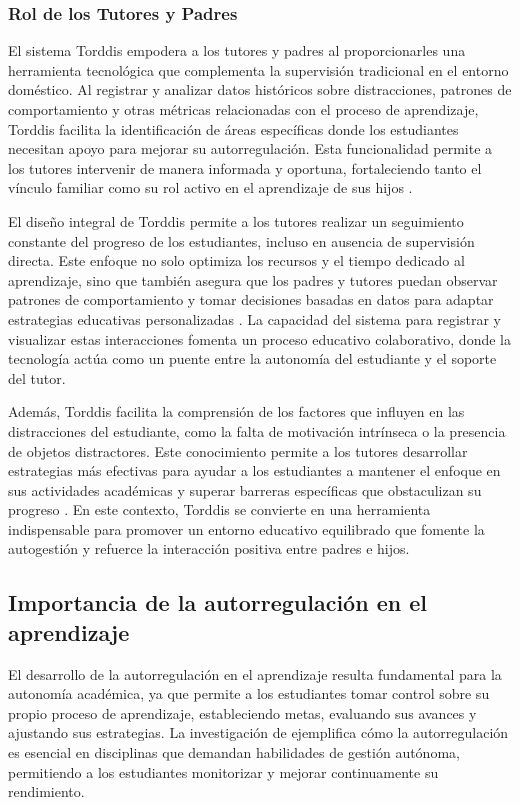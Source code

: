 \documentclass[a4paper,fleqn]{cas-sc}
\begin{document}
		\subsubsection{Rol de los Tutores y Padres}
			
			El sistema Torddis empodera a los tutores y padres al proporcionarles una herramienta tecnológica que complementa la supervisión tradicional en el entorno doméstico. Al registrar y analizar datos históricos sobre distracciones, patrones de comportamiento y otras métricas relacionadas con el proceso de aprendizaje, Torddis facilita la identificación de áreas específicas donde los estudiantes necesitan apoyo para mejorar su autorregulación. Esta funcionalidad permite a los tutores intervenir de manera informada y oportuna, fortaleciendo tanto el vínculo familiar como su rol activo en el aprendizaje de sus hijos \citep{Loh2025Plugging}.
			
			El diseño integral de Torddis permite a los tutores realizar un seguimiento constante del progreso de los estudiantes, incluso en ausencia de supervisión directa. Este enfoque no solo optimiza los recursos y el tiempo dedicado al aprendizaje, sino que también asegura que los padres y tutores puedan observar patrones de comportamiento y tomar decisiones basadas en datos para adaptar estrategias educativas personalizadas \citep{Navarro2024}. La capacidad del sistema para registrar y visualizar estas interacciones fomenta un proceso educativo colaborativo, donde la tecnología actúa como un puente entre la autonomía del estudiante y el soporte del tutor.
			
			Además, Torddis facilita la comprensión de los factores que influyen en las distracciones del estudiante, como la falta de motivación intrínseca o la presencia de objetos distractores. Este conocimiento permite a los tutores desarrollar estrategias más efectivas para ayudar a los estudiantes a mantener el enfoque en sus actividades académicas y superar barreras específicas que obstaculizan su progreso \citep{Ackermans2025Young}. En este contexto, Torddis se convierte en una herramienta indispensable para promover un entorno educativo equilibrado que fomente la autogestión y refuerce la interacción positiva entre padres e hijos.
			
		\subsection{Importancia de la autorregulación en el aprendizaje}
			El desarrollo de la autorregulación en el aprendizaje resulta fundamental para la autonomía académica, ya que permite a los estudiantes tomar control sobre su propio proceso de aprendizaje, estableciendo metas, evaluando sus avances y ajustando sus estrategias. La investigación de \cite{Taber2024Developing} ejemplifica cómo la autorregulación es esencial en disciplinas que demandan habilidades de gestión autónoma, permitiendo a los estudiantes monitorizar y mejorar continuamente su rendimiento.
			
\end{document}
